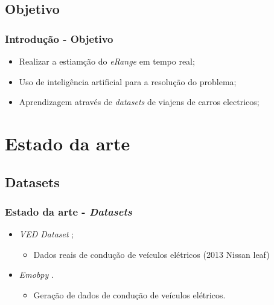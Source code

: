 \documentclass{beamer}
\begin{document}
\subsection[Objetivo]{Objetivo}
\begin{frame}
\frametitle{Introdução - Objetivo}

\begin{itemize}
	\item Realizar a estiamção do \textit{eRange} em tempo real;
	\item Uso de inteligência artificial para a resolução do problema;
	\item Aprendizagem através de \textit{datasets} de viajens de carros electricos;
\end{itemize}

\end{frame}

\section[StateOfArt]{Estado da arte}
\subsection[Datasets]{Datasets}
\begin{frame}
\frametitle{Estado da arte - \textit{Datasets}}

\begin{itemize}
	\item \textit{VED Dataset} ;
		  \begin{itemize}
			  \item Dados reais de condução de veículos elétricos (2013 Nissan leaf)  
		  \end{itemize}
	\item \textit{Emobpy} .
		  \begin{itemize}
			  \item Geração de dados de condução de veículos elétricos.
		  \end{itemize}
\end{itemize}

\end{frame}
\end{document}
